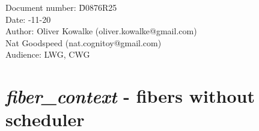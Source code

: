 \documentclass[fontsize=10pt,paper=A4,pagesize,DIV=15]{scrartcl}
\begin{document}
\small
\begin{tabbing}
    Document number: \= D0876R25\\
    Date:            -11-20\\
    Author:          \> Oliver Kowalke (oliver.kowalke@gmail.com)\\
                     \> Nat Goodspeed (nat.cognitoy@gmail.com)\\
    Audience:        \> LWG, CWG\\
\end{tabbing}

\section*{\emph{fiber\_context} - fibers without scheduler}


\tableofcontents




\newpage




























\end{document}
